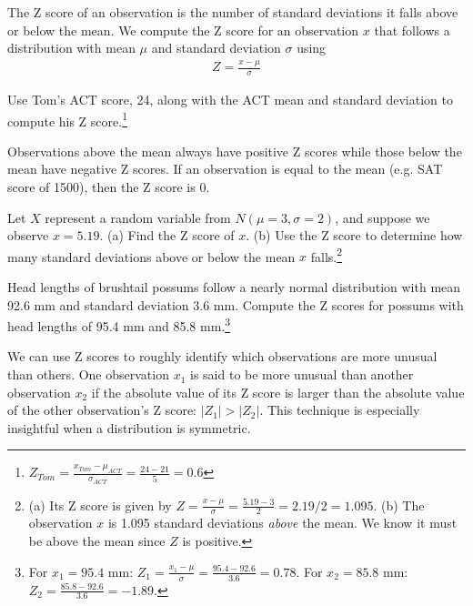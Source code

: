 \begin{termBox}{
The Z score of an observation is the number of standard deviations it falls above or below the mean. We compute the Z score for an observation $x$ that follows a distribution with mean $\mu$ and standard deviation $\sigma$ using
\begin{eqnarray*}
Z = \frac{x-\mu}{\sigma}
\end{eqnarray*}}
\end{termBox}

\begin{exercise}
Use Tom's ACT score, 24, along with the ACT mean and standard deviation to compute his Z score.\footnote{$Z_{Tom} = \frac{x_{Tom} - \mu_{ACT}}{\sigma_{ACT}} = \frac{24 - 21}{5} = 0.6$}
\end{exercise}

Observations above the mean always have positive Z scores while those below the mean have negative Z scores. If an observation is equal to the mean (e.g. SAT score of 1500), then the Z score is $0$.

\begin{exercise}
Let $X$ represent a random variable from $N(\mu=3, \sigma=2)$, and suppose we observe $x=5.19$. (a) Find the Z score of $x$. (b) Use the Z score to determine how many standard deviations above or below the mean $x$ falls.\footnote{(a) Its Z score is given by $Z = \frac{x-\mu}{\sigma} = \frac{5.19 - 3}{2} = 2.19/2 = 1.095$. (b) The observation $x$ is 1.095 standard deviations \emph{above} the mean. We know it must be above the mean since $Z$ is positive.}
\end{exercise}

\begin{exercise} \label{headLZScore}
Head lengths of brushtail possums follow a nearly normal distribution with mean 92.6 mm and standard deviation 3.6 mm. Compute the Z scores for possums with head lengths of 95.4 mm and 85.8 mm.\footnote{For $x_1=95.4$ mm: $Z_1 = \frac{x_1 - \mu}{\sigma} = \frac{95.4 - 92.6}{3.6} = 0.78$. For $x_2=85.8$ mm: $Z_2 = \frac{85.8 - 92.6}{3.6} = -1.89$.}
\end{exercise}

We can use Z scores to roughly identify which observations are more unusual than others. One observation $x_1$ is said to be more unusual than another observation $x_2$ if the absolute value of its Z score is larger than the absolute value of the other observation's Z score: $|Z_1| > |Z_2|$. This technique is especially insightful when a distribution is symmetric.

